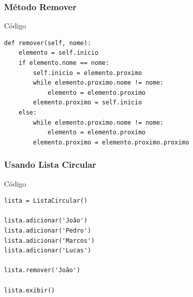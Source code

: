 \documentclass{beamer}
\begin{document}
\begin{frame}[fragile]
\frametitle{Método Remover}

\begin{exampleblock}{Código}

\begin{lstlisting}
def remover(self, nome): 
    elemento = self.inicio
    if elemento.nome == nome:
        self.inicio = elemento.proximo
        while elemento.proximo.nome != nome:
            elemento = elemento.proximo
        elemento.proximo = self.inicio
    else:
        while elemento.proximo.nome != nome:
            elemento = elemento.proximo
        elemento.proximo = elemento.proximo.proximo
\end{lstlisting}
\end{exampleblock}
\end{frame}

\begin{frame}[fragile]
\frametitle{Usando Lista Circular}

\begin{exampleblock}{Código}

\begin{lstlisting}
lista = ListaCircular()

lista.adicionar('João')
lista.adicionar('Pedro')
lista.adicionar('Marcos')
lista.adicionar('Lucas')

lista.remover('João')

lista.exibir()
\end{lstlisting}
\end{exampleblock}
\end{frame}
\end{document}
